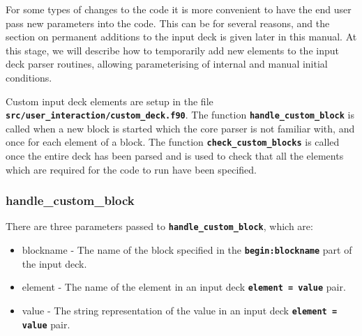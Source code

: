 \documentclass[12pt,a4paper]{article}
\newcommand{\inlinecode}[1]{{\color{warwickred} \bf\texttt{#1}}}
\begin{document}
For some types of changes to the code it is more convenient to have the end
user pass new parameters into the code. This can be for several reasons, and
the section on permanent additions to the input deck is given later in this
manual. At this stage, we will describe how to temporarily add new
elements to the input deck parser routines, allowing parameterising of
internal and manual initial conditions.

Custom input deck elements are setup in the file
\inlinecode{src/user\_interaction/custom\_deck.f90}. The function
\inlinecode{handle\_custom\_block} is called when a new block is started which
the core parser is not familiar with, and once for each element of a block. The
function \inlinecode{check\_custom\_blocks} is called once the entire deck has
been parsed and is used to check that all the elements which are required for
the code to run have been specified.

\subsubsection{handle\_custom\_block}
There are three parameters passed to \inlinecode{handle\_custom\_block}, which
are:
\begin{itemize}
\item blockname - The name of the block specified in the
  \inlinecode{begin:blockname} part of the input deck.
\item element - The name of the element in an input deck
  \inlinecode{element = value} pair.
\item value - The string representation of the value in an input deck
  \inlinecode{element = value} pair.
\end{itemize}
\end{document}
